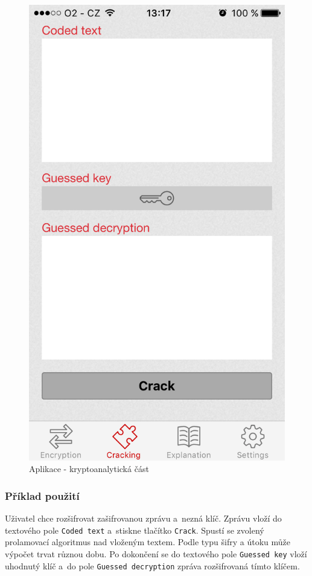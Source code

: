 \documentclass[glossaries, index]{kidiplom}
\begin{document}
\begin{figure}[htbp]
\centering
\includegraphics[scale=0.32]{graphics/app/cracking.png}
\caption{Aplikace - kryptoanalytická část}
\label{app-cracking}
\end{figure}

\subsubsection{Příklad použití}
Uživatel chce rozšifrovat zašifrovanou zprávu a~nezná klíč. Zprávu vloží do textového pole \texttt{Coded text} a~stiskne tlačítko \texttt{Crack}. Spustí se zvolený prolamovací algoritmus nad vloženým textem. Podle typu šifry a útoku může výpočet trvat různou dobu. Po dokončení se do textového pole \texttt{Guessed key} vloží uhodnutý klíč a~do pole \texttt{Guessed decryption} zpráva rozšifrovaná tímto klíčem.
\end{document}
